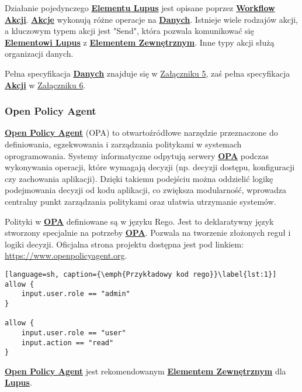 Działanie pojedynczego \hyperlink{def:element-lupus}{\textbf{Elementu Lupus}} jest opisane poprzez \hyperlink{def:workflow-petli}{\textbf{Workflow Akcji}}. \hyperlink{def:akcja}{\textbf{Akcje}} wykonują różne operacje na \hyperlink{def:dane}{\textbf{Danych}}. Istnieje wiele rodzajów akcji, a kluczowym typem akcji jest "Send", która pozwala komunikować się \hyperlink{def:element-lupus}{\textbf{Elementowi Lupus}} z \hyperlink{def:element-zewnetrzny}{\textbf{Elementem Zewnętrznym}}. Inne typy akcji służą organizacji danych.


Pełna specyfikacja \hyperlink{def:dane}{\textbf{Danych}} znajduje się w \hyperref[appendix:5]{Załączniku 5}, zaś pełna specyfikacja \hyperlink{def:akcja}{\textbf{Akcji}} w \hyperref[appendix:6]{Załączniku 6}.

\subsubsection{Open Policy Agent}

\hyperlink{def:opa}{\textbf{Open Policy Agent}} (OPA) to otwartoźródłowe narzędzie przeznaczone do definiowania, egzekwowania i zarządzania politykami w systemach oprogramowania. Systemy informatyczne odpytują serwery \hyperlink{def:opa}{\textbf{OPA}} podczas wykonywania operacji, które wymagają decyzji (np. decyzji dostępu, konfiguracji czy zachowania aplikacji). Dzięki takiemu podejściu można oddzielić logikę podejmowania decyzji od kodu aplikacji, co zwiększa modularność, wprowadza centralny punkt zarządzania politykami oraz ułatwia utrzymanie systemów.

Polityki w \hyperlink{def:opa}{\textbf{OPA}} definiowane są w języku Rego. Jest to deklaratywny język stworzony specjalnie na potrzeby \hyperlink{def:opa}{\textbf{OPA}}. Pozwala na tworzenie złożonych reguł i logiki decyzji. Oficjalna strona projektu dostępna jest pod linkiem: \url{https://www.openpolicyagent.org}.

\begin{lstlisting}[language=sh, caption={\emph{Przykładowy kod rego}}\label{lst:1}]
allow {
    input.user.role == "admin"
}

allow {
    input.user.role == "user"
    input.action == "read"
}
\end{lstlisting}

\hyperlink{def:opa}{\textbf{Open Policy Agent}} jest rekomendowanym \hyperlink{def:element-zewnetrzny}{\textbf{Elementem Zewnętrznym}} dla \hyperlink{def:lupus}{\textbf{Lupus}}.